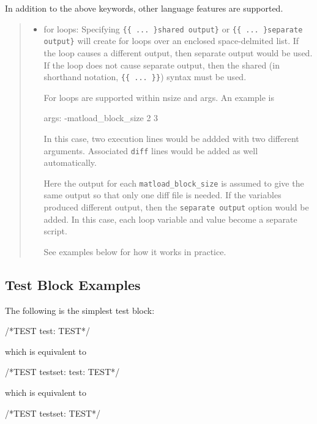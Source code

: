 In addition to the above keywords, other language features are
supported.
%
\begin{quote}
%
\begin{itemize}

\item for loops:  Specifying \lstinline!{{ ... }shared output}!
      or \lstinline!{{ ... }separate output}!
      will create for loops over an enclosed space-delmited list.
      If the loop causes a different output, then separate output would
      be used.  If the loop does not cause separate output, then the
      shared (in shorthand notation, \lstinline!{{ ... }}!) syntax must be used.

For loops are supported within nsize and args.  An example is
%
\begin{outputlisting}
args: -matload_block_size {{2 3}}
\end{outputlisting}

In this case, two execution lines would be addded with two different
arguments.  Associated \lstinline{diff} lines would be added as well
automatically.

Here the output for each
\lstinline{matload_block_size} is assumed to give the same output so
that only one diff file is needed.  If the variables
produced different output, then the \lstinline{separate output} option would be added.  In this case, each loop
variable and value become a separate script.

See examples below for how it works in practice.

\end{itemize}

\end{quote}


\subsection{Test Block Examples%
  \label{test-block-examples}%
}


The following is the simplest test block:
%
\begin{outputlisting}
/*TEST
  test:
TEST*/
\end{outputlisting}
which is equivalent to
\begin{outputlisting}
/*TEST
  testset:
    test:
TEST*/
\end{outputlisting}
which is equivalent to
\begin{outputlisting}
/*TEST
  testset:
TEST*/
\end{outputlisting}

